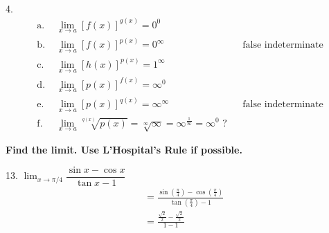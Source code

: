 \documentclass{article}
\begin{document}
\begin{description}
\begin{description}
\begin{align*}
                \end{align*}
          \item 4.
                \begin{align*}
                  \text{a. } & \lim_{x\to a} [f(x)]^{g(x)} = 0^0                                                                                                        \\
                  \text{b. } & \lim_{x\to a} [f(x)]^{p(x)} = 0^{\infty}                                                                 &  & \text{false indeterminate} \\
                  \text{c. } & \lim_{x\to a} [h(x)]^{p(x)} = 1^{\infty}                                                                                                 \\
                  \text{d. } & \lim_{x\to a} [p(x)]^{f(x)} = \infty^0                                                                                                   \\
                  \text{e. } & \lim_{x\to a} [p(x)]^{q(x)} = \infty^{\infty}                                                            &  & \text{false indeterminate} \\
                  \text{f. } & \lim_{x\to a} \sqrt[q(x)]{p(x)} = \sqrt[\infty]{\infty} = \infty^{\frac{1}{\infty}} = \infty^0 \text{ ?}
                \end{align*}
        \end{description}
  \item\textbf{Find the limit. Use L'Hospital's Rule if possible.}
        \begin{description}
          \setlength\itemsep{2em}
          \item 13. $\lim_{x\to\pi/4} \dfrac{\sin{x} - \cos{x}}{\tan{x} - 1}$
                \begin{align*}
                   & = \frac{\sin{\left(\frac{\pi}{4}\right)} - \cos{\left(\frac{\pi}{4}\right)}}{\tan{\left(\frac{\pi}{4}\right)} - 1} \\[1em]
                   & = \frac{\frac{\sqrt{2}}{2} - \frac{\sqrt{2}}{2}}{1 - 1}                                                            \\[1em]
                \end{align*}


\end{description}
\end{description}
\end{document}
